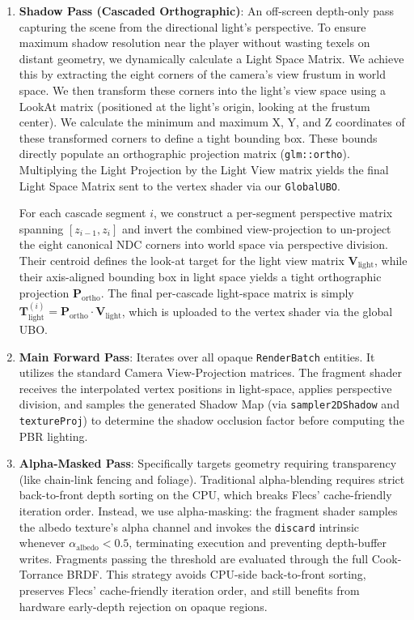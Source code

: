 \documentclass[acmtog, nonacm]{acmart}
\begin{document}
\begin{enumerate}
    \item \textbf{Shadow Pass (Cascaded Orthographic)}: An off-screen depth-only pass capturing the scene from the directional light's perspective. To ensure maximum shadow resolution near the player without wasting texels on distant geometry, we dynamically calculate a Light Space Matrix.
    We achieve this by extracting the eight corners of the camera's view frustum in world space. We then transform these corners into the light's view space using a LookAt matrix (positioned at the light's origin, looking at the frustum center). We calculate the minimum and maximum X, Y, and Z coordinates of these transformed corners to define a tight bounding box. These bounds directly populate an orthographic projection matrix (\texttt{glm::ortho}). Multiplying the Light Projection by the Light View matrix yields the final Light Space Matrix sent to the vertex shader via our \texttt{GlobalUBO}.
    
    For each cascade segment $i$, we construct a per-segment perspective matrix spanning $[z_{i-1}, z_i]$ and invert the combined view-projection to un-project the eight canonical NDC corners into world space via perspective division. Their centroid defines the look-at target for the light view matrix $\mathbf{V}_{\text{light}}$, while their axis-aligned bounding box in light space yields a tight orthographic projection $\mathbf{P}_{\text{ortho}}$. The final per-cascade light-space matrix is simply $\mathbf{T}_{\text{light}}^{(i)} = \mathbf{P}_{\text{ortho}} \cdot \mathbf{V}_{\text{light}}$, which is uploaded to the vertex shader via the global UBO.

    \item \textbf{Main Forward Pass}: Iterates over all opaque \texttt{RenderBatch} entities. It utilizes the standard Camera View-Projection matrices. The fragment shader receives the interpolated vertex positions in light-space, applies perspective division, and samples the generated Shadow Map (via \texttt{sampler2DShadow} and \texttt{textureProj}) to determine the shadow occlusion factor before computing the PBR lighting.

    \item \textbf{Alpha-Masked Pass}: Specifically targets geometry requiring transparency (like chain-link fencing and foliage). Traditional alpha-blending requires strict back-to-front depth sorting on the CPU, which breaks Flecs' cache-friendly iteration order. Instead, we use alpha-masking: the fragment shader samples the albedo texture's alpha channel and invokes the \texttt{discard} intrinsic whenever $\alpha_{\text{albedo}} < 0.5$, terminating execution and preventing depth-buffer writes. Fragments passing the threshold are evaluated through the full Cook-Torrance BRDF. This strategy avoids CPU-side back-to-front sorting, preserves Flecs' cache-friendly iteration order, and still benefits from hardware early-depth rejection on opaque regions.


\end{enumerate}
\end{document}
